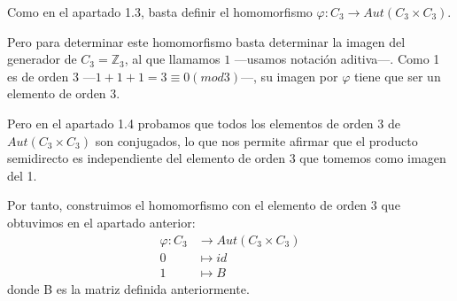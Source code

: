 \documentclass[a4paper, 11pt]{article}
\begin{document}
  \begin{solucion}
      Como en el apartado 1.3, basta definir el homomorfismo $\varphi: C_3 \to Aut(C_3 \times C_3)$.

      Pero para determinar este homomorfismo basta determinar la imagen del generador de $C_3 = \mathbb{Z}_3$, al que llamamos $1$ ---usamos notación aditiva---. Como 1 es de orden 3 ---$1+1+1=3 \equiv 0 (mod 3)$---, su imagen por $\varphi$ tiene que ser un elemento de orden 3.

      Pero en el apartado 1.4 probamos que todos los elementos de orden 3 de $Aut(C_3 \times C_3)$ son conjugados, lo que nos permite afirmar que el producto semidirecto es independiente del elemento de orden 3 que tomemos como imagen del 1.

      Por tanto, construimos el homomorfismo con el elemento de orden 3 que obtuvimos en el apartado anterior:
      \begin{align*}
          \varphi : C_3 &\longrightarrow Aut(C_3 \times C_3) \\
          0 &\longmapsto id \\
          1 &\longmapsto B
      \end{align*}
      donde B es la matriz definida anteriormente.


\end{solucion}
\end{document}
